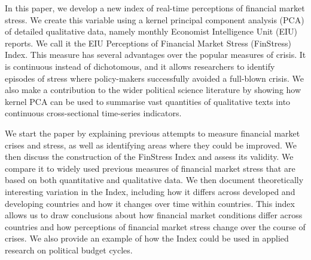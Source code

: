 \documentclass[]{article}
\begin{document}
In this paper, we develop a new index of real-time perceptions of financial market stress. We create this variable using a kernel principal component analysis (PCA) of detailed qualitative data, namely monthly Economist Intelligence Unit (EIU) reports. We call it the EIU Perceptions of Financial Market Stress (FinStress) Index. This measure has several advantages over the popular measures of crisis. It is continuous instead of dichotomous, and it allows researchers to identify episodes of stress where policy-makers successfully avoided a full-blown crisis. We also make a contribution to the wider political science literature by showing how kernel PCA can be used to summarise vast quantities of qualitative texts into continuous cross-sectional time-series indicators.

We start the paper by explaining previous attempts to measure financial market crises and stress, as well as identifying areas where they could be improved. We then discuss the construction of the FinStress Index and assess its validity. We compare it to widely used previous measures of financial market stress that are based on both quantitative and qualitative data. We then document theoretically interesting variation in the Index, including how it differs across developed and developing countries and how it changes over time within countries. This index allows us to draw conclusions about how financial market conditions differ across countries and how perceptions of financial market stress change over the course of crises. We also provide an example of how the Index could be used in applied research on political budget cycles.
\end{document}
